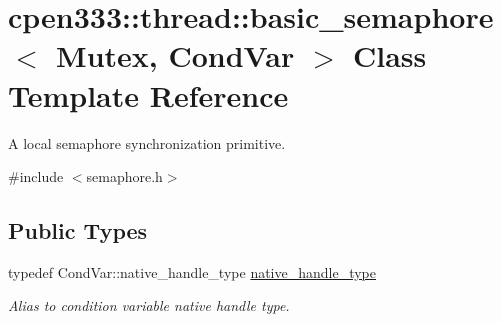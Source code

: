 \hypertarget{classcpen333_1_1thread_1_1basic__semaphore}{}\section{cpen333\+:\+:thread\+:\+:basic\+\_\+semaphore$<$ Mutex, Cond\+Var $>$ Class Template Reference}
\label{classcpen333_1_1thread_1_1basic__semaphore}


A local semaphore synchronization primitive.  




{\ttfamily \#include $<$semaphore.\+h$>$}

\subsection*{Public Types}
\begin{DoxyCompactItemize}
\item 
\mbox{\label{classcpen333_1_1thread_1_1basic__semaphore_a15d9956adddf81d3a39aea36c6c0fd18}} 
typedef Cond\+Var\+::native\+\_\+handle\+\_\+type \hyperlink{classcpen333_1_1thread_1_1basic__semaphore_a15d9956adddf81d3a39aea36c6c0fd18}{native\+\_\+handle\+\_\+type}
\begin{DoxyCompactList}\small\item\em Alias to condition variable native handle type. \end{DoxyCompactList}\end{DoxyCompactItemize}
